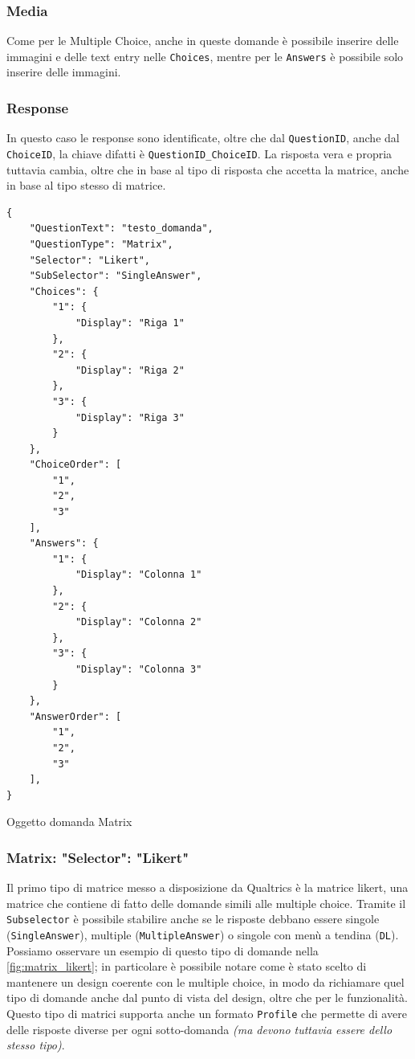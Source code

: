 \subsubsection{Media}
Come per le Multiple Choice, anche in queste domande è possibile inserire delle immagini e delle text entry nelle \texttt{Choices}, mentre per le \texttt{Answers} è possibile solo inserire delle immagini.

\subsubsection{Response}
In questo caso le response sono identificate, oltre che dal \texttt{QuestionID}, anche dal \texttt{ChoiceID}, la chiave difatti è \texttt{QuestionID\_ChoiceID}. La risposta vera e propria tuttavia cambia, oltre che in base al tipo di risposta che accetta la matrice, anche in base al tipo stesso di matrice.

\begin{json}
\begin{verbatim}
{
    "QuestionText": "testo_domanda",
    "QuestionType": "Matrix",
    "Selector": "Likert",
    "SubSelector": "SingleAnswer",
    "Choices": {
        "1": {
            "Display": "Riga 1"
        },
        "2": {
            "Display": "Riga 2"
        },
        "3": {
            "Display": "Riga 3"
        }
    },
    "ChoiceOrder": [
        "1",
        "2",
        "3"
    ],
    "Answers": {
        "1": {
            "Display": "Colonna 1"
        },
        "2": {
            "Display": "Colonna 2"
        },
        "3": {
            "Display": "Colonna 3"
        }
    },
    "AnswerOrder": [
        "1",
        "2",
        "3"
    ],
}
\end{verbatim}
\caption{Oggetto domanda Matrix}
\label{json:matrix}
\end{json}

\subsubsection{Matrix: "Selector": "Likert"}
Il primo tipo di matrice messo a disposizione da Qualtrics è la matrice likert, una matrice che contiene di fatto delle domande simili alle multiple choice. Tramite il \texttt{Subselector} è possibile stabilire anche se le risposte debbano essere singole (\texttt{SingleAnswer}), multiple (\texttt{MultipleAnswer}) o singole con menù a tendina (\texttt{DL}). Possiamo osservare un esempio di questo tipo di domande nella \autoref{fig:matrix_likert}; in particolare è possibile notare come è stato scelto di mantenere un design coerente con le multiple choice, in modo da richiamare quel tipo di domande anche dal punto di vista del design, oltre che per le funzionalità. Questo tipo di matrici supporta anche un formato \texttt{Profile} che permette di avere delle risposte diverse per ogni sotto-domanda \textit{(ma devono tuttavia essere dello stesso tipo)}.

